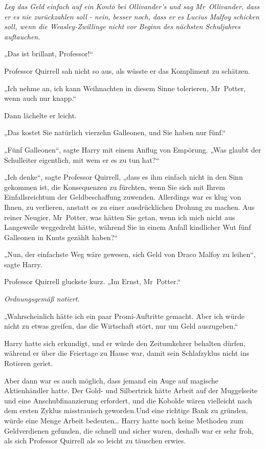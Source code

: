 {\emph{Leg das Geld einfach auf ein Konto bei Ollivander's und sag Mr~Ollivander, dass er es nie zurückzahlen soll - nein, besser noch, dass er es Lucius Malfoy schicken soll, wenn die Weasley-Zwillinge nicht vor Beginn des nächsten Schuljahres auftauchen.}

„Das ist brillant, Professor!“

Professor Quirrell sah nicht so aus, als wüsste er das Kompliment zu schätzen.

„Ich nehme an, ich kann Weihnachten in diesem Sinne tolerieren, Mr~Potter, wenn auch nur knapp.“

Dann lächelte er leicht.

„Das kostet Sie natürlich vierzehn Galleonen, und Sie haben nur fünf.“

„Fünf Galleonen“, sagte Harry mit einem Anflug von Empörung. „Was glaubt der Schulleiter eigentlich, mit wem er es zu tun hat?“

„Ich denke“, sagte Professor Quirrell, „dass es ihm einfach nicht in den Sinn gekommen ist, die Konsequenzen zu fürchten, wenn Sie sich mit Ihrem Einfallsreichtum der Geldbeschaffung zuwenden. Allerdings war es klug von Ihnen, zu verlieren, anstatt es zu einer ausdrücklichen Drohung zu machen. Aus reiner Neugier, Mr~Potter, was hätten Sie getan, wenn ich mich nicht aus Langeweile weggedreht hätte, während Sie in einem Anfall kindlicher Wut fünf Galleonen in Knuts gezählt haben?“

„Nun, der einfachste Weg wäre gewesen, sich Geld von Draco Malfoy zu leihen“, sagte Harry.

Professor Quirrell gluckste kurz. „Im Ernst, Mr~Potter.“

\emph{Ordnungsgemäß notiert.}

„Wahrscheinlich hätte ich ein paar Promi-Auftritte gemacht. Aber ich würde nicht zu etwas greifen, das die Wirtschaft stört, nur um Geld auszugeben.“

Harry hatte sich erkundigt, und er würde den Zeitumkehrer behalten dürfen, während er über die Feiertage zu Hause war, damit sein Schlafzyklus nicht ins Rotieren geriet.

Aber dann war es auch möglich, dass jemand ein Auge auf magische Aktienhändler hatte. Der Gold- und Silbertrick hätte Arbeit auf der Muggelseite und eine Anschubfinanzierung erfordert, und die Kobolde wären vielleicht nach dem ersten Zyklus misstrauisch geworden.Und eine richtige Bank zu gründen, würde eine Menge Arbeit bedeuten… Harry hatte noch keine Methoden zum Geldverdienen gefunden, die schnell und sicher waren, deshalb war er sehr froh, als sich Professor Quirrell als so leicht zu täuschen erwies.

}
